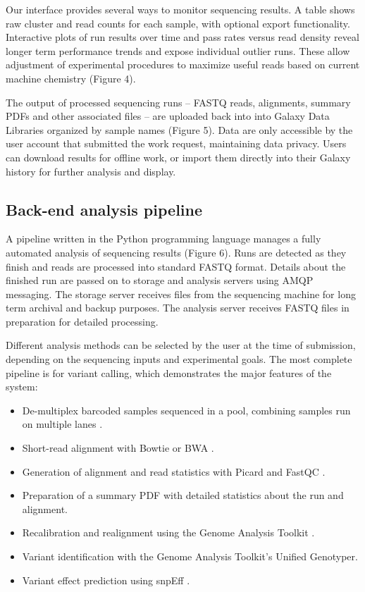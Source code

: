 \documentclass[10pt]{bmc_article}
\newenvironment{bmcformat}{\begin{raggedright}\baselineskip20pt\sloppy\setboolean{publ}{false}}{\end{raggedright}\baselineskip20pt\sloppy}
\begin{document}
\begin{bmcformat}
Our interface provides several ways to monitor sequencing results.
A table shows raw cluster and read counts for each sample, with
optional export functionality.  Interactive plots of run results over
time and pass rates versus read density reveal longer term performance
trends and expose individual outlier runs. These allow adjustment of
experimental procedures to maximize useful reads based on current
machine chemistry (Figure 4).

The output of processed sequencing runs -- FASTQ reads, alignments,
summary PDFs and other associated files -- are uploaded back
into into Galaxy Data Libraries organized by sample names (Figure
5). Data are only accessible by the user account that submitted the
work request, maintaining data privacy. Users can download results for
offline work, or import them directly into their Galaxy history for
further analysis and display.

\subsection*{Back-end analysis pipeline}

A pipeline written in the Python programming language manages a fully
automated analysis of sequencing results (Figure 6). Runs are detected
as they finish and reads are processed into standard FASTQ
format. Details about the finished run are passed on to storage and
analysis servers using AMQP messaging. The storage server receives
files from the sequencing machine for long term archival and backup
purposes. The analysis server receives FASTQ files in preparation for
detailed processing.

Different analysis methods can be selected by the user at the time of
submission, depending on the sequencing inputs and experimental
goals. The most complete pipeline is for variant calling, which
demonstrates the major features of the system:

\begin{itemize}
  \item De-multiplex barcoded samples sequenced in a pool, combining
    samples run on multiple lanes \cite{cock_biopython:_2009}.
  \item Short-read alignment with Bowtie or BWA
    \cite{langmead_ultrafast_2009,li_fast_2009}.
  \item Generation of alignment and read statistics with Picard and
    FastQC \cite{_picard_????,fastqc}.
  \item Preparation of a summary PDF with detailed statistics
    about the run and alignment.
  \item Recalibration and realignment using the Genome Analysis
    Toolkit
    \cite{mckenna_genome_2010,_pysam_????,gautier_intuitive_2010}.
  \item Variant identification with the Genome Analysis Toolkit's
    Unified Genotyper.
  \item Variant effect prediction using snpEff \cite{_snpeff_????}.
\end{itemize}


\end{bmcformat}
\end{document}
